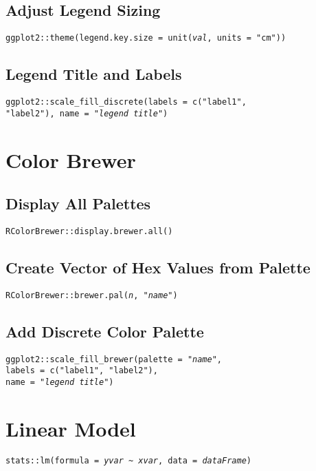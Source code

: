 \documentclass{tufte-handout}
\newenvironment{subs}
  {\adjustwidth{3em}{0pt}}
  {\endadjustwidth}
\begin{document}
\begin{subs}
\vspace{3mm}
\subsection{Adjust Legend Sizing}
\noindent \texttt{ggplot2::}{\color{red}\texttt{theme}}\texttt{(legend.key.size = unit(\textit{val}, units = "cm"))}

\vspace{3mm}
\subsection{Legend Title and Labels}
\noindent \texttt{ggplot2::}{\color{red}\texttt{scale\_fill\_discrete}}\texttt{(labels = c("label1", \\"label2"), name = "\textit{legend title}")}
\end{subs}

\vspace{5mm}
\section{Color Brewer}
\begin{subs}
\subsection{Display All Palettes}
\noindent \texttt{RColorBrewer::}{\color{red}\texttt{display.brewer.all}}\texttt{()}

\vspace{3mm}
\subsection{Create Vector of Hex Values from Palette}
\noindent \texttt{RColorBrewer::}{\color{red}\texttt{brewer.pal}}\texttt{(\textit{n}, "\textit{name}")}

\vspace{3mm}
\subsection{Add Discrete Color Palette}
\noindent \texttt{ggplot2::}{\color{red}\texttt{scale\_fill\_brewer}}\texttt{(palette = "\textit{name}", \\labels = c("label1", "label2"), \\name = "\textit{legend title}")}
\end{subs}

\vspace{5mm}
\section{Linear Model}
\noindent \texttt{stats::}{\color{red}\texttt{lm}}\texttt{(formula = \textit{yvar} \textasciitilde\ \textit{xvar}, data = \textit{dataFrame})}
\end{document}
